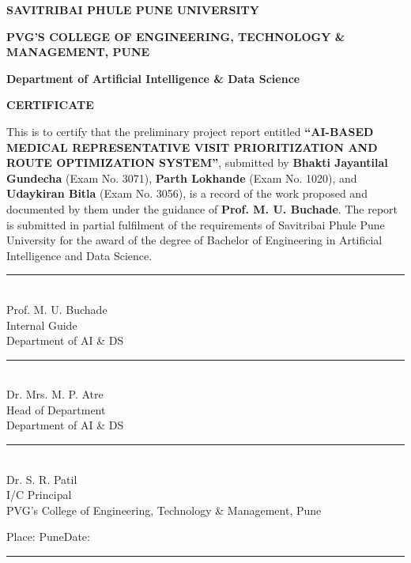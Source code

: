 \documentclass[12pt,a4paper,oneside]{report}
\newcommand{\reporttitle}{AI-BASED MEDICAL REPRESENTATIVE VISIT PRIORITIZATION AND ROUTE OPTIMIZATION SYSTEM}
\newcommand{\college}{PVG's College of Engineering, Technology \& Management, Pune}
\newcommand{\department}{Department of Artificial Intelligence \& Data Science}
\newcommand{\guidename}{Prof. M. U. Buchade}
\newcommand{\studentone}{Bhakti Jayantilal Gundecha}
\newcommand{\studenttwo}{Parth Lokhande}
\newcommand{\studentthree}{Udaykiran Bitla}
\newcommand{\exone}{3071}
\newcommand{\extwo}{1020}
\newcommand{\exthree}{3056}
\begin{document}
\clearpage
{}
\thispagestyle{plain}
\begingroup{}\selectfont\setlength{\parskip}{0pt}
\begin{center}
{\bfseries\fontsize{12}{15}\selectfont SAVITRIBAI PHULE PUNE UNIVERSITY}\par
\vspace{2mm}
{\bfseries\fontsize{14}{17}\selectfont PVG'S COLLEGE OF ENGINEERING, TECHNOLOGY \& MANAGEMENT, PUNE}\par
\vspace{2mm}
{\bfseries\fontsize{12}{15}\selectfont \department}\par
\vspace{8mm}
{\bfseries\fontsize{14}{17}\selectfont CERTIFICATE}\par
\end{center}
\vspace{5mm}
\noindent This is to certify that the preliminary project report entitled \textbf{``\reporttitle''}, submitted by \textbf{\studentone} (Exam No. \exone), \textbf{\studenttwo} (Exam No. \extwo), and \textbf{\studentthree} (Exam No. \exthree), is a record of the work proposed and documented by them under the guidance of \textbf{\guidename}. The report is submitted in partial fulfilment of the requirements of Savitribai Phule Pune University for the award of the degree of Bachelor of Engineering in Artificial Intelligence and Data Science.

\vspace{14mm}
\noindent\begin{minipage}[t]{0.45\textwidth}
\centering
\rule{55mm}{0.4pt}\\
\guidename\\
Internal Guide\\
Department of AI \& DS
\end{minipage}
\hfill
\begin{minipage}[t]{0.45\textwidth}
\centering
\rule{55mm}{0.4pt}\\
Dr. Mrs. M. P. Atre\\
Head of Department\\
Department of AI \& DS
\end{minipage}
\vspace{12mm}
\begin{center}
\rule{65mm}{0.4pt}\\
Dr. S. R. Patil\\
I/C Principal\\
\college
\end{center}
\vfill
\noindent Place: Pune\hfill Date: \rule{35mm}{0.4pt}
\endgroup
\end{document}
